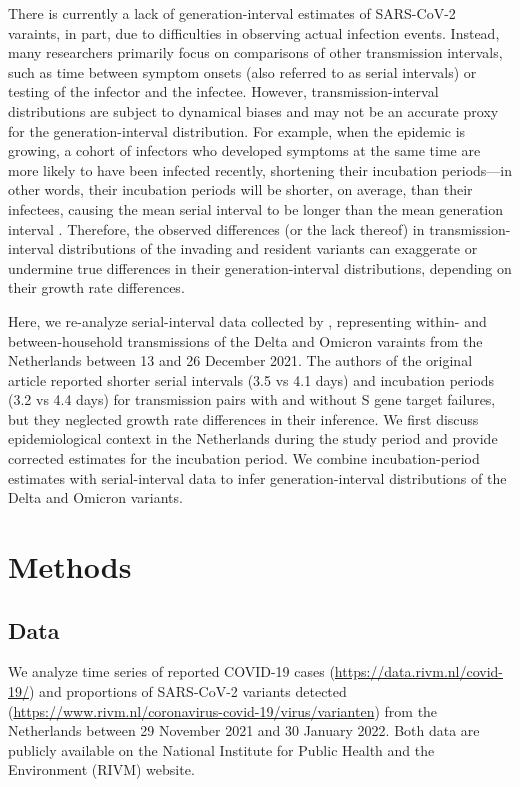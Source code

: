 \documentclass[12pt]{article}
\begin{document}
There is currently a lack of generation-interval estimates of SARS-CoV-2 varaints, in part, due to difficulties in observing actual infection events.
Instead, many researchers primarily focus on comparisons of other transmission intervals, such as time between symptom onsets (also referred to as serial intervals) or testing \citep{abbott2022test} of the infector and the infectee.
However, transmission-interval distributions are subject to dynamical biases and may not be an accurate proxy for the generation-interval distribution.
For example, when the epidemic is growing, a cohort of infectors who developed symptoms at the same time are more likely to have been infected recently, shortening their incubation periods---in other words, their incubation periods will be shorter, on average, than their infectees, causing the mean serial interval to be longer than the mean generation interval \citep{park2021forward}.
Therefore, the observed differences (or the lack thereof) in transmission-interval distributions of the invading and resident variants can exaggerate or undermine true differences in their generation-interval distributions, depending on their growth rate differences.

Here, we re-analyze serial-interval data collected by \citep{backer2021omicron}, representing within- and between-household transmissions of the Delta and Omicron varaints from the Netherlands between 13 and 26 December 2021.
The authors of the original article reported shorter serial intervals (3.5 vs 4.1 days) and incubation periods (3.2 vs 4.4 days) for transmission pairs with and without S gene target failures, but they neglected growth rate differences in their inference.
We first discuss epidemiological context in the Netherlands during the study period and provide corrected estimates for the incubation period.
We combine incubation-period estimates with serial-interval data to infer generation-interval distributions of the Delta and Omicron variants.

\section{Methods}

\subsection{Data}

We analyze time series of reported COVID-19 cases (\url{https://data.rivm.nl/covid-19/}) and proportions of SARS-CoV-2 variants detected (\url{https://www.rivm.nl/coronavirus-covid-19/virus/varianten}) from the Netherlands between 29 November 2021 and 30 January 2022.
Both data are publicly available on the National Institute for Public Health and the Environment (RIVM) website.
\end{document}
